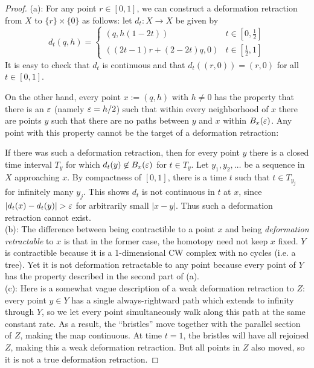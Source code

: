 \documentclass{amsart}
\begin{document}
\begin{proof}
	(a): For any point $r\in [0,1]$, we can construct a deformation retraction from $X$ to $\{r\}\times \{0\}$ as follows: let $d_t:X\to X$ be given by
	$$
	d_t(q,h) = \begin{cases}
		(q,h(1 - 2t)) & t\in [0,\tfrac12]\\
		((2t-1)r+(2-2t)q,0) & t\in [\tfrac12,1]
	\end{cases}
	$$
	It is easy to check that $d_t$ is continuous and that $d_t((r,0)) = (r,0)$ for all $t\in[0,1]$.
	
	On the other hand, every point $x:=(q,h)$ with $h\neq 0$ has the property that there is an $\varepsilon$ (namely $\varepsilon=h/2$) such that within every neighborhood of $x$ there are points $y$ such that there are no paths between $y$ and $x$ within $B_{x}(\varepsilon)$. Any point with this property cannot be the target of a deformation retraction:
	
	If there was such a deformation retraction, then for every point $y$ there is a closed time interval $T_y$ for which $d_t(y)\not\in B_{x}(\varepsilon)$ for $t\in T_y$. Let $y_1,y_2,\dots$ be a sequence in $X$ approaching $x$. By compactness of $[0,1]$, there is a time $t$ such that $t\in T_{y_j}$ for infinitely many $y_j$. This shows $d_t$ is not continuous in $t$ at $x$, since $|d_t(x)-d_t(y)|>\ep$ for arbitrarily small $|x-y|$. Thus such a deformation retraction cannot exist.\\
	
	(b): The difference between being contractible to a point $x$ and being \textit{deformation retractable} to $x$ is that in the former case, the homotopy need not keep $x$ fixed. $Y$ is contractible because it is a 1-dimensional CW complex with no cycles (i.e. a tree). Yet it is not deformation retractable to any point because every point of $Y$ has the property described in the second part of (a).\\
	
	(c): Here is a somewhat vague description of a weak deformation retraction to $Z$: every point $y\in Y$ has a single always-rightward path which extends to infinity through $Y$, so we let every point simultaneously walk along this path at the same constant rate. As a result, the ``bristles'' move together with the parallel section of $Z$, making the map continuous. At time $t=1$, the bristles will have all rejoined $Z$, making this a weak deformation retraction. But all points in $Z$ also moved, so it is not a true deformation retraction.
\end{proof}
\end{document}
